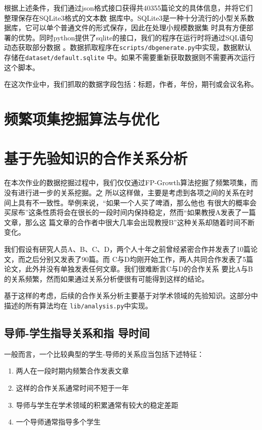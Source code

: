 \documentclass[a4paper]{article}
\begin{document}
根据上述条件，我们通过json格式接口获得共40355篇论文的具体信息，并将它们整理保存在SQLite3格式的文本数
据库中。SQLite3是一种十分流行的小型关系数据库，它可以单个普通文件的形式保存，因此在处理小规模数据集
时具有方便部署的优势。同时python提供了sqlite的接口，我们的程序在运行时将通过SQL语句动态获取部分数据
。数据抓取程序在\texttt{scripts/dbgenerate.py}中实现，数据默认存储在\texttt{dataset/default.sqlite}
中。如果不需要重新获取数据则不需要再次运行这个脚本。

在这次作业中，我们抓取的数据字段包括：标题，作者，年份，期刊或会议名称。

\section{频繁项集挖掘算法与优化}

\section{基于先验知识的合作关系分析}
在本次作业的数据挖掘过程中，我们仅仅通过FP-Growth算法挖掘了频繁项集，而没有进行进一步的关系挖掘。之
所以这样做，主要是考虑到各项之间的关系在时间上具有不一致性。举例来说，``如果一个人买了啤酒，那么他也
有很大的概率会买尿布''这条性质将会在很长的一段时间内保持稳定，然而``如果教授A发表了一篇文章，那么这
篇文章的合作者中很大几率会出现教授B''这种关系却随着时间不断变化。

我们假设有研究人员A、B、C、D，两个人十年之前曾经紧密合作并发表了10篇论文，而之后分别又发表了90篇。而
C与D均刚开始工作，两人共同合作发表了5篇论文，此外并没有单独发表任何文章。我们很难断言C与D的合作关系
要比A与B的关系频繁，然而如果通过关系分析便很有可能得到这样的结论。

基于这样的考虑，后续的合作关系分析主要基于对学术领域的先验知识。这部分中描述的所有算法均在
\texttt{lib/analysis.py}中实现。

\subsection{导师-学生指导关系和指 导时间}
一般而言，一个比较典型的学生-导师的关系应当包括下述特征：
\begin{enumerate}
  \item 两人在一段时期内频繁合作发表文章
  \item 这样的合作关系通常时间不短于一年
  \item 导师与学生在学术领域的积累通常有较大的稳定差距
  \item 一个导师通常指导多个学生
\end{enumerate}
\end{document}
